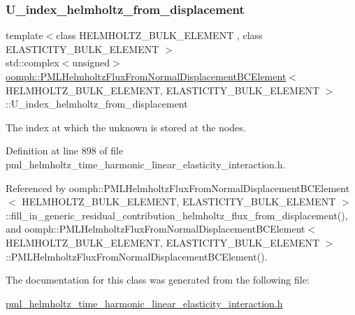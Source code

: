 \subsubsection{\texorpdfstring{U\+\_\+index\+\_\+helmholtz\+\_\+from\+\_\+displacement}{U\_index\_helmholtz\_from\_displacement}}
{\footnotesize\ttfamily template$<$class H\+E\+L\+M\+H\+O\+L\+T\+Z\+\_\+\+B\+U\+L\+K\+\_\+\+E\+L\+E\+M\+E\+NT , class E\+L\+A\+S\+T\+I\+C\+I\+T\+Y\+\_\+\+B\+U\+L\+K\+\_\+\+E\+L\+E\+M\+E\+NT $>$ \\
std\+::complex$<$unsigned$>$ \hyperlink{classoomph_1_1PMLHelmholtzFluxFromNormalDisplacementBCElement}{oomph\+::\+P\+M\+L\+Helmholtz\+Flux\+From\+Normal\+Displacement\+B\+C\+Element}$<$ H\+E\+L\+M\+H\+O\+L\+T\+Z\+\_\+\+B\+U\+L\+K\+\_\+\+E\+L\+E\+M\+E\+NT, E\+L\+A\+S\+T\+I\+C\+I\+T\+Y\+\_\+\+B\+U\+L\+K\+\_\+\+E\+L\+E\+M\+E\+NT $>$\+::U\+\_\+index\+\_\+helmholtz\+\_\+from\+\_\+displacement\hspace{0.3cm}{\ttfamily [private]}}



The index at which the unknown is stored at the nodes. 



Definition at line 898 of file pml\+\_\+helmholtz\+\_\+time\+\_\+harmonic\+\_\+linear\+\_\+elasticity\+\_\+interaction.\+h.



Referenced by oomph\+::\+P\+M\+L\+Helmholtz\+Flux\+From\+Normal\+Displacement\+B\+C\+Element$<$ H\+E\+L\+M\+H\+O\+L\+T\+Z\+\_\+\+B\+U\+L\+K\+\_\+\+E\+L\+E\+M\+E\+N\+T, E\+L\+A\+S\+T\+I\+C\+I\+T\+Y\+\_\+\+B\+U\+L\+K\+\_\+\+E\+L\+E\+M\+E\+N\+T $>$\+::fill\+\_\+in\+\_\+generic\+\_\+residual\+\_\+contribution\+\_\+helmholtz\+\_\+flux\+\_\+from\+\_\+displacement(), and oomph\+::\+P\+M\+L\+Helmholtz\+Flux\+From\+Normal\+Displacement\+B\+C\+Element$<$ H\+E\+L\+M\+H\+O\+L\+T\+Z\+\_\+\+B\+U\+L\+K\+\_\+\+E\+L\+E\+M\+E\+N\+T, E\+L\+A\+S\+T\+I\+C\+I\+T\+Y\+\_\+\+B\+U\+L\+K\+\_\+\+E\+L\+E\+M\+E\+N\+T $>$\+::\+P\+M\+L\+Helmholtz\+Flux\+From\+Normal\+Displacement\+B\+C\+Element().



The documentation for this class was generated from the following file\+:\begin{DoxyCompactItemize}
\item 
\hyperlink{pml__helmholtz__time__harmonic__linear__elasticity__interaction_8h}{pml\+\_\+helmholtz\+\_\+time\+\_\+harmonic\+\_\+linear\+\_\+elasticity\+\_\+interaction.\+h}\end{DoxyCompactItemize}
